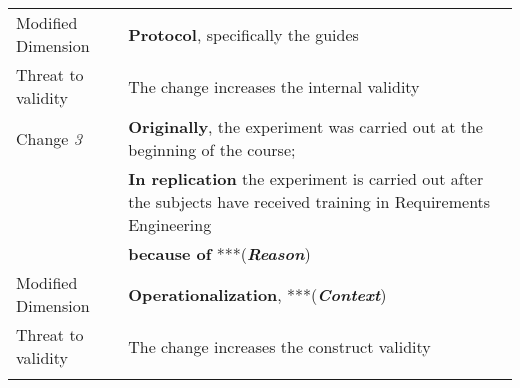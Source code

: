 \begin{table*}[h]
\begin{tabularx}{\textwidth}{
  >{\hsize=0.3\hsize}X
  >{\hsize=0.8\hsize}X}
    Modified Dimension & 
    \textbf{Protocol}, specifically the guides \\   
    Threat to validity & The change increases the internal validity  \\  \hline
    
 
    
    Change \textit{3}   & \textbf{Originally}, the experiment was carried out at the beginning of the course;\\
    & \textbf{In replication} the experiment is carried out after the subjects have received training in Requirements Engineering \\& \textbf{because of} ***(\textbf{\textit{Reason}})\\
    
    Modified Dimension & 
    \textbf{Operationalization}, ***(\textbf{\textit{Context}}) \\
     Threat to validity & The change increases the construct validity  \\  
    \noalign{\smallskip\smallskip}\hline

    
    
	\end{tabularx}  
	
\end{table*}